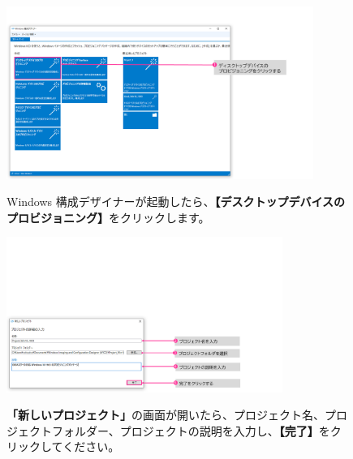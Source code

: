\begin{figure}[hp]
    \begin{minipage}{0.6\textwidth}
        \vspace{0cm}
        \includegraphics[width=10cm]{figures/MakeProvisioningPackage-02}
    \end{minipage}
    \begin{minipage}{0.4\textwidth}
        Windows 構成デザイナーが起動したら、\textbf{【デスクトップデバイスのプロビジョニング】}をクリックします。
    \end{minipage}
\end{figure}


\begin{figure}[hp]
    \begin{minipage}{0.6\textwidth}
        \vspace{-2.5cm}
        \includegraphics[width=9cm]{figures/MakeProvisioningPackage-03}
    \end{minipage}
    \begin{minipage}{0.4\textwidth}
        \textbf{「新しいプロジェクト」}の画面が開いたら、プロジェクト名、プロジェクトフォルダー、プロジェクトの説明を入力し、\textbf{【完了】}をクリックしてください。
    \end{minipage}
\end{figure}

